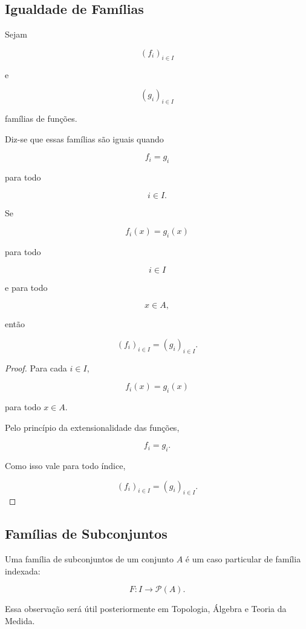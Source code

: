 \documentclass[../../main]{subfiles}
\begin{document}
\subsection{Igualdade de Famílias}

\begin{defn}
	\label{def:matematica:funcoes:familias:igualdade}

	Sejam

	\[
		(f_i)_{i\in I}
	\]

	e

	\[
		(g_i)_{i\in I}
	\]

	famílias de funções.

	Diz-se que essas famílias são iguais quando

	\[
		f_i=g_i
	\]

	para todo

	\[
		i\in I.
	\]

\end{defn}

\begin{prop}
	\label{prop:matematica:funcoes:familias:extensionalidade}

	Se

	\[
		f_i(x)
		=
		g_i(x)
	\]

	para todo

	\[
		i\in I
	\]

	e para todo

	\[
		x\in A,
	\]

	então

	\[
		(f_i)_{i\in I}
		=
		(g_i)_{i\in I}.
	\]

\end{prop}

\begin{proof}

	Para cada \(i\in I\),

	\[
		f_i(x)
		=
		g_i(x)
	\]

	para todo \(x\in A\).

	Pelo princípio da extensionalidade das funções,

	\[
		f_i=g_i.
	\]

	Como isso vale para todo índice,

	\[
		(f_i)_{i\in I}
		=
		(g_i)_{i\in I}.
	\]

\end{proof}

\subsection{Famílias de Subconjuntos}

\begin{obs}

	Uma família de subconjuntos de um conjunto \(A\) é um caso
	particular de família indexada:

	\[
		F:I\to\mathcal P(A).
	\]

	Essa observação será útil posteriormente em Topologia,
	Álgebra e Teoria da Medida.

\end{obs}
\end{document}
